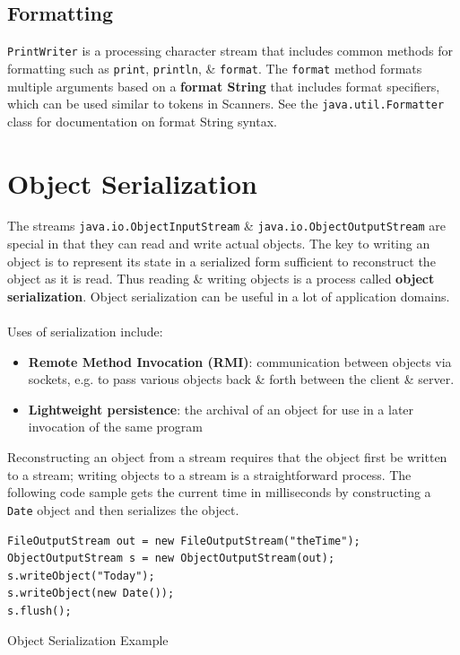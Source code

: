 \documentclass[a4paper,11pt]{article}
\newenvironment{code}{\captionsetup{type=listing}}{}
\begin{document}
\subsection{Formatting}
\verb|PrintWriter| is a processing character stream that includes common methods for formatting such as 
\verb|print|, \verb|println|, \& \verb|format|.
The \verb|format| method formats multiple arguments based on a \textbf{format String} that includes format specifiers, 
which can be used similar to tokens in Scanners.
See the \verb|java.util.Formatter| class for documentation on format String syntax.

\section{Object Serialization}
The streams \verb|java.io.ObjectInputStream| \& \verb|java.io.ObjectOutputStream| are special in that they can 
read and write actual objects.
The key to writing an object is to represent its state in a serialized form sufficient to reconstruct the object 
as it is read.
Thus reading \& writing objects is a process called \textbf{object serialization}.
Object serialization can be useful in a lot of application domains.
\\\\
Uses of serialization include:
\begin{itemize}
    \item   \textbf{Remote Method Invocation (RMI)}: communication between objects via sockets, e.g. to pass 
            various objects back \& forth between the client \& server.
    \item   \textbf{Lightweight persistence}: the archival of an object for use in a later invocation of the same
            program
\end{itemize}

Reconstructing an object from a stream requires that the object first be written to a stream; writing objects to 
a stream is a straightforward process. 
The following code sample gets the current time in milliseconds by constructing a \verb|Date| object and then
serializes the object.
\begin{code}
\begin{verbatim}
FileOutputStream out = new FileOutputStream("theTime");
ObjectOutputStream s = new ObjectOutputStream(out);
s.writeObject("Today");
s.writeObject(new Date());
s.flush();
\end{verbatim}
\caption{Object Serialization Example}
\end{code}
\end{document}
